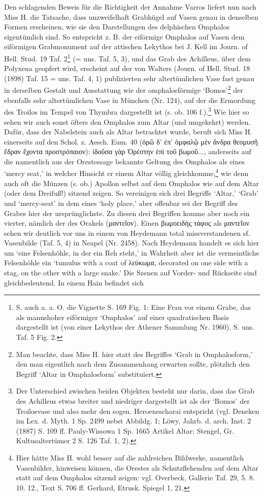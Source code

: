 \documentclass[a4paper, 11pt, oneside]{article}
\begin{document}
Den schlagenden Beweis für die Richtigkeit der Annahme Varros liefert nun nach Miss H. die Tatsache, dass unzweifelhaft Grabhügel auf Vasen genau in denselben Formen erscheinen, wie sie den Darstellungen des delphischen Omphalos eigentümlich sind. So entspricht z. B. der eiförmige Omphalos auf Vasen dem eiförmigen Grabmonument auf der attischen Lekythos bei J. Kell im Journ. of Hell. Stud. 19 Taf. 2\footnote{S. auch a. a. O. die Vignette S. 169 Fig. 1: Eine Frau vor einem Grabe, das als mannshoher eiförmiger `Omphalos' auf einer quadratischen Basis dargestellt ist (von einer Lekythos der Athener Sammlung Nr. 1960). S. uns. Taf. 5 Fig. 2.} (= uns. Taf. 5, 3), und das Grab des Achilleus, über dem Polyxena geopfert wird, erscheint auf der von Walters (Journ. of Hell. Stud. 18 (1898) Taf. 15 = uns. Taf. 4, 1) publizierten sehr altertümlichen Vase fast genau in derselben Gestalt und Ausstattung wie der omphalosförmige `Bomos'\footnote{Man beachte, dass Miss H. hier statt des Begriffes `Grab in Omphalosform,' den man eigentlich nach dem Zusammenhang erwarten sollte, plötzlich den Begriff `Altar in Omphalosform' substituiert.} der ebenfalls sehr altertümlichen Vase in München (Nr. 124), auf der die Ermordung des Troilos im Tempel von Thymbra dargestellt ist (s. ob. 106 f.).\footnote{Der Unterschied zwischen beiden Objekten besteht nur darin, dass das Grab des Achilleus etwas breiter und niedriger dargestellt ist als der `Bomos' der Troilosvase und also mehr den sogen. Heroenescharai entspricht (vgl. Deneken im Lex. d. Myth. 1 Sp. 2499 nebst Abbildg. 1; Löwy, Jahrb. d. arch. Inst. 2 (1887) S. 109 ff. Pauly-Wissowa 1 Sp. 1665 Artikel Altar; Stengel, Gr. Kultusaltertümer 2 S. 126 Taf. 1, 2).} Wie hier so sehen wir auch sonst öfters den Omphalos zum Altar (und umgekehrt) werden. Dafür, dass der Nabelstein auch als Altar betrachtet wurde, beruft sich Miss H. einerseits auf den Schol. z. Aesch. Eum. 40 (ὁρῶ δ' ἐπ' ὀμφαλῷ μὲν ἄνδρα θεομυσῆ ἕδραν ἔχοντα προστρόπαιον): ἰδοῦσα γὰρ Ὀρέστην ἐπὶ τοῦ βωμοῦ..., anderseits auf die namentlich aus der Orestessage bekannte Geltung des Omphalos als eines `mercy seat,' in welcher Hinsicht er einem Altar völlig gleichkomme,\footnote{Hier hätte Miss H. wohl besser auf die zahlreichen Bildwerke, namentlich Vasenbilder, hinweisen können, die Orestes als Schutzflehenden auf dem Altar statt auf dem Omphalos sitzend zeigen: vgl. Overbeck, Gallerie Taf. 29, 5. 8. 10. 12., Text S. 706 ff. Gerhard, Etrusk. Spiegel 1, 21.} wie denn auch oft die Münzen (s. ob.) Apollon selbst auf dem Omphalos wie auf dem Altar (oder dem Dreifuß!) sitzend zeigen. So vereinigen sich drei Begriffe `Altar,' `Grab' und `mercy-seat' in dem eines `holy place,' aber offenbar sei der Begriff des Grabes hier der ursprünglichste. Zu diesen drei Begriffen komme aber noch ein vierter, nämlich der des Orakels (μαντεῖον). Einen βωμοειδὴς τάφος als μαντεῖον sehen wir deutlich vor uns in einem von Heydemann total missverstandenen sf. Vasenbilde (Taf. 5, 4) in Neapel (Nr. 2458). Nach Heydemann handelt es sich hier um `eine Felsenhöhle, in der ein Reh steht,' in Wahrheit aber ist die vermeintliche Felsenhöhle ein `tumulus with a coat of λεύκωμα, decorated on one side with a stag, on the other with a large snake.' Die Szenen auf Vorder- und Rückseite sind gleichbedeutend. In einem Hain befindet sich 
\end{document}
